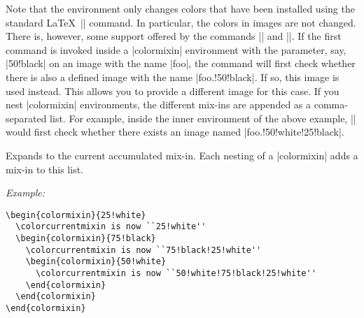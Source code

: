 \documentclass{ltxdoc}
\def\example{\par\smallskip\noindent\textit{Example: }}
\begin{document}
Note that the environment only changes colors that have been installed
using the standard \LaTeX\ |\color| command. In particular,
the colors in images are not changed. There is, however, some support
offered by the commands |\pgfuseimage| and
|\pgfuseshading|. If the first command is invoked 
inside a |colormixin| environment with the parameter, say,
|50!black| on an image with the name |foo|, the command
will first check whether there is also a defined image with the name
|foo.!50!black|. If so, this image is used instead. This allows
you to provide a different image for this case. If you nest
|colormixin| environments, the different mix-ins are appended as
a comma-separated list. For example, inside the inner environment of
the above example, || would first check whether
there exists an image named |foo.!50!white!25!black|.

\begin{command}{}
  Expands to the current accumulated mix-in. Each nesting of a
  |colormixin| adds a mix-in to this list.
  \example 
\begin{verbatim}
\begin{colormixin}{25!white}
  \colorcurrentmixin is now ``25!white''
  \begin{colormixin}{75!black}
    \colorcurrentmixin is now ``75!black!25!white''
    \begin{colormixin}{50!white}
      \colorcurrentmixin is now ``50!white!75!black!25!white''
    \end{colormixin}
  \end{colormixin}
\end{colormixin}
\end{verbatim}
\end{command}
\end{document}
